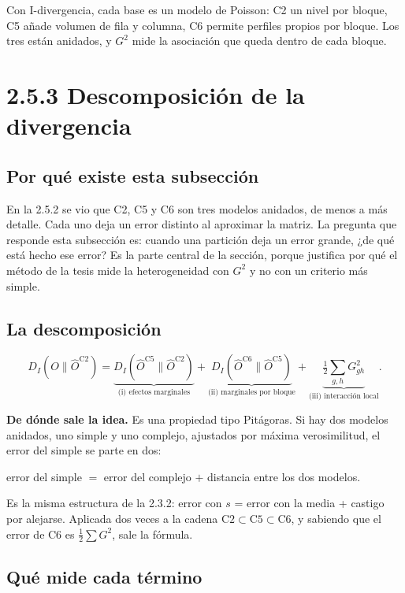 \documentclass[11pt,a4paper]{article}
\newenvironment{idea}{\par\begin{center}\begin{lrbox}{\ideabox}\begin{minipage}{0.9\linewidth}}{\end{minipage}\end{lrbox}\fcolorbox{blue!40!black}{blue!5}{\usebox{\ideabox}}\end{center}}
\begin{document}
\begin{idea}
Con I-divergencia, cada base es un modelo de Poisson: C2 un nivel por bloque, C5
añade volumen de fila y columna, C6 permite perfiles propios por bloque. Los tres
están anidados, y $G^2$ mide la asociación que queda dentro de cada bloque.
\end{idea}

\section{2.5.3 Descomposición de la divergencia}

\subsection{Por qué existe esta subsección}

En la 2.5.2 se vio que C2, C5 y C6 son tres modelos anidados, de menos a más
detalle. Cada uno deja un error distinto al aproximar la matriz. La pregunta que
responde esta subsección es: cuando una partición deja un error grande, ¿de qué
está hecho ese error? Es la parte central de la sección, porque justifica por qué
el método de la tesis mide la heterogeneidad con $G^2$ y no con un criterio más
simple.

\subsection{La descomposición}

\[
  D_I(O\|\hat O^{\mathrm{C2}})=
  \underbrace{D_I(\hat O^{\mathrm{C5}}\|\hat O^{\mathrm{C2}})}_{\text{(i) efectos marginales}}+
  \underbrace{D_I(\hat O^{\mathrm{C6}}\|\hat O^{\mathrm{C5}})}_{\text{(ii) marginales por bloque}}+
  \underbrace{\tfrac12\sum_{g,h}G^2_{gh}}_{\text{(iii) interacción local}}.
\]

\textbf{De dónde sale la idea.} Es una propiedad tipo Pitágoras. Si hay dos
modelos anidados, uno simple y uno complejo, ajustados por máxima verosimilitud,
el error del simple se parte en dos:
\begin{center}
error del simple $=$ error del complejo $+$ distancia entre los dos modelos.
\end{center}
Es la misma estructura de la 2.3.2: error con $s$ = error con la media + castigo
por alejarse. Aplicada dos veces a la cadena $\mathrm{C2}\subset\mathrm{C5}\subset\mathrm{C6}$,
y sabiendo que el error de C6 es $\tfrac12\sum G^2$, sale la fórmula.

\subsection{Qué mide cada término}
\end{document}
